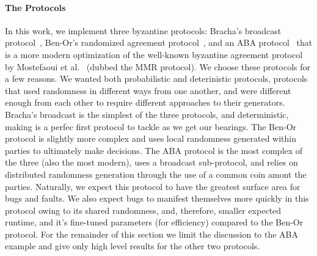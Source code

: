 \paragraph{The Protocols}
In this work, we implement three byzantine protocols: Bracha's broadcast
protocol~\cite{brachabcast}, Ben-Or's randomized agreement
protocol~\cite{benoragreement}, and an ABA protocol~\cite{aba} that is a more
modern optimization of the well-known byzantine agreement protocol by
Mostefaoui et al.~\cite{mmr} (dubbed the MMR protocol).  We choose these
protocols for a few reasons.  We wanted both probabilistic and deterinistic
protocols, protocols that used randomness in different ways from one another,
and were different enough from each other to require different approaches to
their generators.  Bracha's broadcast is the simplest of the three protocols,
and deterministic, making is a perfec first protocol to tackle as we get our
bearings.  The Ben-Or protocol is slightly more complex and uses local
randomness generated within parties to ultimately make decisions.  The ABA
protocol is the most complex of the three (also the most modern), uses a
broadcast sub-protocol, and relies on distributed randomness generation through
the use of a common coin amont the parties.  Naturally, we expect this protocol
to have the greatest surface area for bugs and faults.  We also expect bugs to
manifest themselves more quickly in this protocol owing to its shared
randomness, and, therefore, smaller expected runtime, and it's fine-tuned
parameters (for efficiency) compared to the Ben-Or protocol.  For the remainder
of this section we limit the discussion to the ABA example and give only high
level results for the other two protocols.


